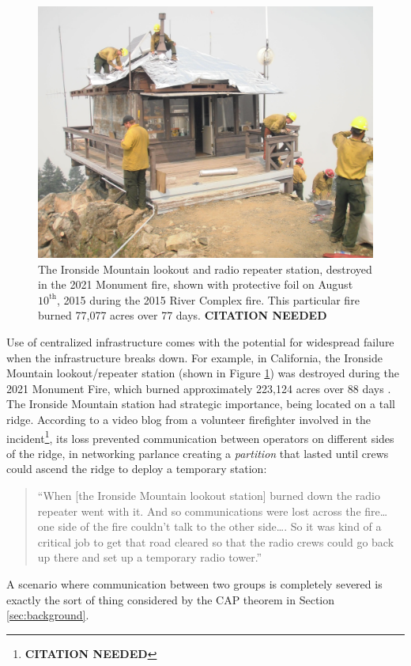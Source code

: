 \documentclass[]             %
{NASA}                       %
\theoremstyle{definition}
\newcommand{\citationneeded}{\footnote{\textbf{CITATION NEEDED}}}
\begin{document}
\begin{figure}[t]
  \centering
  \includegraphics[scale=0.085]{images/ironside.jpg}
  \caption{The Ironside Mountain lookout and radio repeater station, destroyed in the 2021
    Monument fire, shown with protective foil on August
    $10^\textrm{th}$, 2015 during the 2015 River Complex fire. This
    particular fire burned 77,077 acres over 77 days. \textbf{CITATION NEEDED}}
  \label{fig:ironside}
\end{figure}

Use of centralized infrastructure comes with the potential for
widespread failure when the infrastructure breaks down. For example, in
California, the Ironside Mountain lookout/repeater station (shown in
Figure \ref{fig:ironside}) was destroyed during the 2021 Monument
Fire, which burned approximately 223,124 acres over 88 days
\cite{2021:monumentfire}. The Ironside Mountain station had strategic
importance, being located on a tall ridge. According to a video blog
from a volunteer firefighter involved in the incident\citationneeded,
its loss prevented communication between operators on different sides
of the ridge, in networking parlance creating a \emph{partition} that
lasted until crews could ascend the ridge to deploy a temporary
station:
\begin{quote}
  ``When {[}the Ironside Mountain lookout station{]} burned down the radio
  repeater went with it. And so communications were lost across the
  fire\ldots{} one side of the fire couldn't talk to the other side\ldots.
  So it was kind of a critical job to get that road cleared so that the
  radio crews could go back up there and set up a temporary radio tower.''
\end{quote}
A scenario where communication between two groups is completely
severed is exactly the sort of thing considered by the CAP theorem in
Section \ref{sec:background}.
\end{document}
